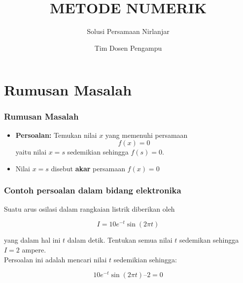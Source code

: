 \documentclass[pdflatex,compress]{beamer}
\title{METODE NUMERIK}
\subtitle{Solusi Persamaan Nirlanjar}
\author{Tim Dosen Pengampu}
\begin{document}
	
\maketitle

\section{Rumusan Masalah}

\begin{frame}
	\frametitle{Rumusan Masalah}
	\begin{itemize}
		\item \textbf{Persoalan:} Temukan nilai $ x $ yang memenuhi persamaan
		\[f(x) = 0\]
		yaitu nilai $ x = s $ sedemikian sehingga $ f(s) = 0 $.
		\item Nilai $ x = s $ disebut \textbf{akar} persamaan $ f(x) = 0 $
	\end{itemize}
\end{frame}

\begin{frame}
	\frametitle{Contoh persoalan dalam bidang elektronika}
	Suatu arus osilasi dalam rangkaian listrik diberikan oleh
	
	\[ I = 10e^{-t}\sin(2 \pi t) \]
	
	yang dalam hal ini $ t $ dalam detik. Tentukan semua nilai $ t $
	sedemikan sehingga $ I = 2 $ ampere.\\
	Persoalan ini adalah mencari nilai $ t $ sedemikian sehingga:

	\[ 10e^{-t} \sin(2 \pi t) – 2 = 0 \]
\end{frame}
\end{document}
